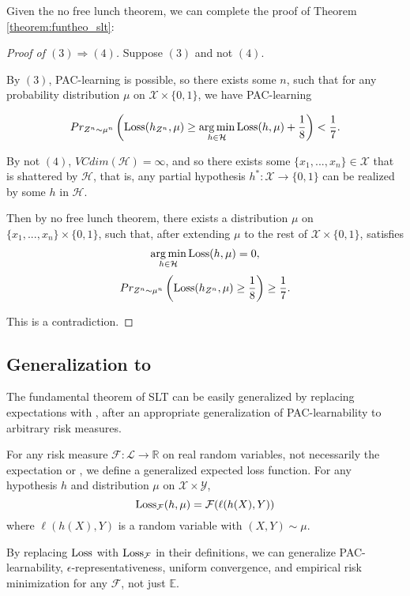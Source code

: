 Given the no free lunch theorem, we can complete the proof of Theorem \ref{theorem:funtheo_slt}:
\begin{proof}[Proof of $(3) \Rightarrow (4)$]
Suppose $(3)$ and not $(4)$. 

By $(3)$, PAC-learning is possible, so there exists some $n$, such that for any probability distribution $\mu$ on $\mathcal{X}\times\{0, 1\}$, we have PAC-learning

$$Pr_{Z^n \sim \mu^n}\left(\operatorname{Loss}(h_{Z^n}, \mu) \ge \operatorname*{arg\,min}_{h\in \mathcal{H}} \operatorname{Loss}(h, \mu) + \frac 1 8\right) < \frac 1 7.$$

By not $(4)$, $VCdim(\mathcal{H}) = \infty$, and so there exists some $\{x_1, ..., x_n\}\in \mathcal{X}$ that is shattered by $\mathcal{H}$, that is, any partial hypothesis $h^* : \mathcal{X}\to \{0, 1\}$ can be realized by some $h$ in $\mathcal{H}$.

Then by no free lunch theorem, there exists a distribution $\mu$ on $\{x_1, ..., x_n\}\times\{0, 1\}$, such that, after extending $\mu$ to the rest of $\mathcal{X}\times \{0, 1\}$, satisfies 
$$\operatorname*{arg\,min}_{h\in \mathcal{H}} \operatorname{Loss}(h, \mu) = 0, $$ 
$$Pr_{Z^n \sim \mu^n}\left(\operatorname{Loss}(h_{Z^n}, \mu) \ge  \frac 1 8\right) \ge \frac 1 7.$$

This is a contradiction.
\end{proof}

\subsection{Generalization to \cvar}\label{sec:slt_cvar}
The fundamental theorem of SLT can be easily generalized by replacing expectations with \cvar, after an appropriate generalization of PAC-learnability to arbitrary risk measures.

\begin{defn}
For any risk measure $\mathcal{F}: \mathscr{L} \to \mathbb{R}$ on real random variables, not necessarily the expectation or \cvar, we define a generalized expected loss function. For any hypothesis $h$ and distribution $\mu$ on $\mathcal{X}\times\mathcal{Y}$, 
\begin{equation}
\operatorname{Loss}_\mathcal{F}(h, \mu) = \mathcal{F}(\ell(h(X), Y))
\end{equation}
where $\ell(h(X), Y)$ is a random variable with $(X, Y)\sim\mu$.
\end{defn}

By replacing $\operatorname{Loss}$ with $\operatorname{Loss}_\mathcal{F}$ in their definitions, we can generalize PAC-learnability, $\epsilon$-representativeness, uniform convergence, and empirical risk minimization for any $\mathcal{F}$, not just $\mathbb{E}$. 

